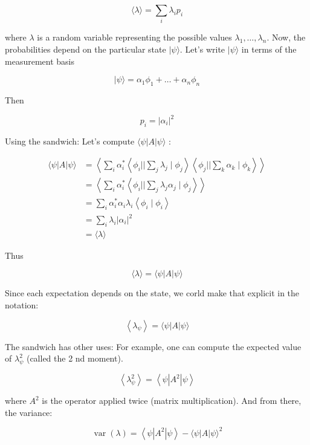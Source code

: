 \documentclass[main.tex]{subfiles}
\begin{document}
    $$
    \langle\lambda\rangle=\sum_{i} \lambda_{i} p_{i}
    $$
    
    where $\lambda$ is a random variable representing the possible values $\lambda_{1}, \ldots, \lambda_{n}$. Now, the probabilities depend on the particular state $|\psi\rangle$. Let's write $|\psi\rangle$ in terms of the measurement basis
    
    $$
    |\psi\rangle=\alpha_{1} \phi_{1}+\ldots+\alpha_{n} \phi_{n}
    $$
    
    Then
    
    $$
    p_{i}=\left|\alpha_{i}\right|^{2}
    $$
    
    Using the sandwich: Let's compute $\langle\psi|A| \psi\rangle$ :
    
    $$
    \begin{aligned}
    \langle\psi|A| \psi\rangle &=\left\langle\sum_{i} \alpha_{i}^{*}\left\langle\phi_{i}|| \sum_{j} \lambda_{j} \mid \phi_{j}\right\rangle\left\langle\phi_{j}|| \sum_{k} \alpha_{k} \mid \phi_{k}\right\rangle\right\rangle \\
    &=\left\langle\sum_{i} \alpha_{i}^{*}\left\langle\phi_{i}|| \sum_{j} \lambda_{j} \alpha_{j} \mid \phi_{j}\right\rangle\right\rangle \\
    &=\sum_{i} \alpha_{i}^{*} \alpha_{i} \lambda_{i}\left\langle\phi_{i} \mid \phi_{i}\right\rangle \\
    &=\sum_{i} \lambda_{i}\left|\alpha_{i}\right|^{2} \\
    &=\langle\lambda\rangle
    \end{aligned}
    $$
    
    Thus
    
    $$
    \langle\lambda\rangle=\langle\psi|A| \psi\rangle
    $$
    
    Since each expectation depends on the state, we corld make that explicit in the notation:
    
    $$
    \left\langle\lambda_{\psi}\right\rangle=\langle\psi|A| \psi\rangle
    $$
    
    The sandwich has other uses: For example, one can compute the expected value of $\lambda_{\psi}^{2}$ (called the 2 nd moment).
    
    $$
    \left\langle\lambda_{\psi}^{2}\right\rangle=\left\langle\psi\left|A^{2}\right| \psi\right\rangle
    $$
    
    where $A^{2}$ is the operator applied twice (matrix multiplication). And from there, the variance:
    
    $$
    \operatorname{var}(\lambda)=\left\langle\psi\left|A^{2}\right| \psi\right\rangle-\langle\psi|A| \psi\rangle^{2}
    $$
    
\end{document}
